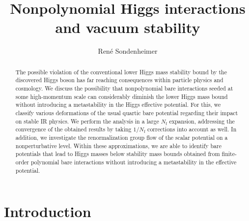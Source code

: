 \documentclass[twocolumn,aps,prd,showpacs,nofootinbib,superscriptaddress,preprintnumbers,floatfix,10pt]{revtex4-1}
\newcommand{\Nf}{N_{\mathrm{f}}}
\begin{document}
\preprint{}


\title{Nonpolynomial Higgs interactions and vacuum stability}


\author{Ren\'{e} Sondenheimer}



\begin{abstract}
The possible violation of the conventional lower Higgs mass stability bound by the discovered Higgs boson has far reaching consequences within particle physics and cosmology.
We discuss the possibility that nonpolynomial bare interactions seeded at some high-momentum scale can considerably diminish the lower Higgs mass bound without introducing a metastability in the Higgs effective potential. For this, we classify various deformations of the usual quartic bare potential regarding their impact on stable IR physics.
We perform the analysis in a large $\Nf$ expansion, addressing the convergence of the obtained results by taking $1/\Nf$ corrections into account as well. 
In addition, we investigate the renormalization group flow of the scalar potential on a nonperturbative level.
%
Within these approximations, we are able to identify bare potentials that lead to Higgs masses below stability mass bounds obtained from finite-order polynomial bare interactions without introducing a metastability in the effective potential.
\end{abstract}

\pacs{}

\maketitle

















\section{Introduction}
\label{intro}
\end{document}
